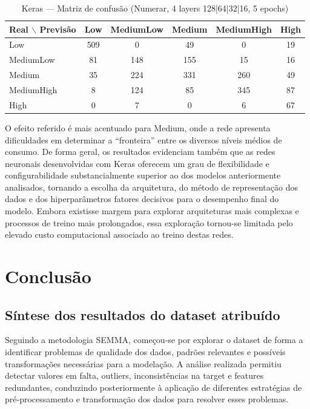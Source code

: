 \documentclass[11pt,a4paper]{article}
\begin{document}
\begin{table}[H]
\centering
\caption{Keras --- Matriz de confusão (Numerar, 4 layers 128|64|32|16, 5 epochs)}
\label{tab:keras_conf_matrix}
\begin{tabular}{lccccc}
\toprule
\textbf{Real $\backslash$ Previsão} & \textbf{Low} & \textbf{MediumLow} & \textbf{Medium} & \textbf{MediumHigh} & \textbf{High} \\
\midrule
Low        & 509 &   0 &  49 &   0 &  19 \\
MediumLow  &  81 & 148 & 155 &  15 &  16 \\
Medium     &  35 & 224 & 331 & 260 &  49 \\
MediumHigh &   8 & 124 &  85 & 345 &  87 \\
High       &   0 &   7 &   0 &   6 &  67 \\
\bottomrule
\end{tabular}
\end{table}

O efeito referido é mais acentuado para Medium, onde a rede apresenta dificuldades em determinar a ``fronteira'' entre os diversos níveis médios de consumo.
De forma geral, os resultados evidenciam também que as redes neuronais desenvolvidas com Keras oferecem um grau de flexibilidade e configurabilidade substancialmente superior ao dos modelos anteriormente analisados, tornando a escolha da arquitetura, do método de representação dos dados e dos hiperparâmetros fatores decisivos para o desempenho final do modelo. Embora existisse margem para explorar arquiteturas mais complexas e processos de treino mais prolongados, essa exploração tornou-se limitada pelo elevado custo computacional associado ao treino destas redes.

\section{Conclusão}

\subsection{Síntese dos resultados do dataset atribuído}

Seguindo a metodologia SEMMA, começou-se por explorar o dataset de forma a identificar problemas de qualidade dos dados, padrões relevantes e possíveis transformações necessárias para a modelação. A análise realizada permitiu detectar valores em falta, outliers, inconsistências na target e features redundantes, conduzindo posteriormente à aplicação de diferentes estratégias de pré-processamento e transformação dos dados para resolver esses problemas.
\end{document}
